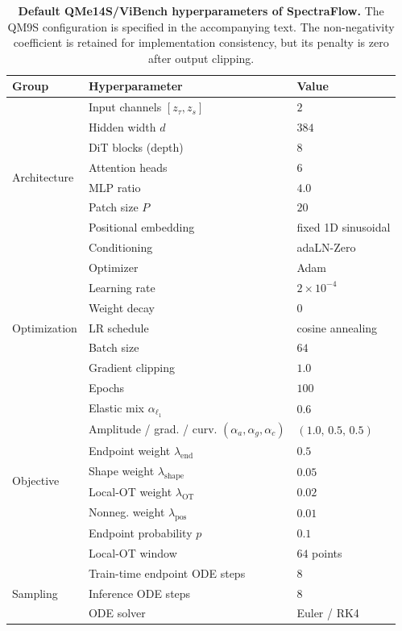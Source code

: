 \documentclass[pdflatex,sn-mathphys-num]{sn-jnl}%
\newcommand{\mname}{SpectraFlow}
\theoremstyle{thmstyleone}%
\theoremstyle{thmstyletwo}%
\theoremstyle{thmstylethree}%
\begin{document}
\begin{appendices}
\begin{table}[htbp]
\centering
\caption{\textbf{Default QMe14S/ViBench hyperparameters of \mname.} The QM9S configuration is specified in the accompanying text. The non-negativity coefficient is retained for implementation consistency, but its penalty is zero after output clipping.}
\label{tab:hyperparams}
\begin{tabular}{@{}lll@{}}
\toprule
Group & Hyperparameter & Value \\
\midrule
\multirow{8}{*}{Architecture}
 & Input channels $[z_\tau,z_s]$ & $2$ \\
 & Hidden width $d$ & $384$ \\
 & DiT blocks (depth) & $8$ \\
 & Attention heads & $6$ \\
 & MLP ratio & $4.0$ \\
 & Patch size $P$ & $20$ \\
 & Positional embedding & fixed 1D sinusoidal \\
 & Conditioning & adaLN-Zero \\
\midrule
\multirow{7}{*}{Optimization}
 & Optimizer & Adam \\
 & Learning rate & $2\times10^{-4}$ \\
 & Weight decay & $0$ \\
 & LR schedule & cosine annealing \\
 & Batch size & $64$ \\
 & Gradient clipping & $1.0$ \\
 & Epochs & $100$ \\
\midrule
\multirow{8}{*}{Objective}
 & Elastic mix $\alpha_{\ell_1}$ & $0.6$ \\
 & Amplitude / grad. / curv. $(\alpha_a,\alpha_g,\alpha_c)$ & $(1.0,\,0.5,\,0.5)$ \\
 & Endpoint weight $\lambda_{\mathrm{end}}$ & $0.5$ \\
 & Shape weight $\lambda_{\mathrm{shape}}$ & $0.05$ \\
 & Local-OT weight $\lambda_{\mathrm{OT}}$ & $0.02$ \\
 & Nonneg. weight $\lambda_{\mathrm{pos}}$ & $0.01$ \\
 & Endpoint probability $p$ & $0.1$ \\
 & Local-OT window & $64$ points \\
\midrule
\multirow{3}{*}{Sampling}
 & Train-time endpoint ODE steps & $8$ \\
 & Inference ODE steps & $8$ \\
 & ODE solver & Euler / RK4 \\
\bottomrule
\end{tabular}
\end{table}


\end{appendices}
\end{document}
